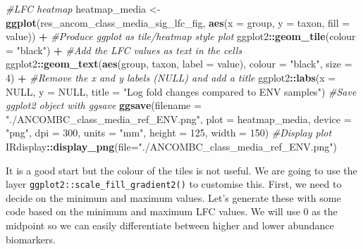 \documentclass[
]{book}
\newenvironment{Shaded}{\begin{snugshade}}{\end{snugshade}}
\newcommand{\AttributeTok}[1]{\textcolor[rgb]{0.13,0.29,0.53}{#1}}
\newcommand{\CommentTok}[1]{\textcolor[rgb]{0.56,0.35,0.01}{\textit{#1}}}
\newcommand{\ConstantTok}[1]{\textcolor[rgb]{0.56,0.35,0.01}{#1}}
\newcommand{\DecValTok}[1]{\textcolor[rgb]{0.00,0.00,0.81}{#1}}
\newcommand{\FunctionTok}[1]{\textcolor[rgb]{0.13,0.29,0.53}{\textbf{#1}}}
\newcommand{\NormalTok}[1]{#1}
\newcommand{\OtherTok}[1]{\textcolor[rgb]{0.56,0.35,0.01}{#1}}
\newcommand{\SpecialCharTok}[1]{\textcolor[rgb]{0.81,0.36,0.00}{\textbf{#1}}}
\newcommand{\StringTok}[1]{\textcolor[rgb]{0.31,0.60,0.02}{#1}}
\begin{document}
\begin{Shaded}
\begin{Highlighting}[]
\CommentTok{\#LFC heatmap}
\NormalTok{heatmap\_media }\OtherTok{\textless{}{-}} \FunctionTok{ggplot}\NormalTok{(res\_ancom\_class\_media\_sig\_lfc\_fig,}
                        \FunctionTok{aes}\NormalTok{(}\AttributeTok{x =}\NormalTok{ group, }\AttributeTok{y =}\NormalTok{ taxon, }\AttributeTok{fill =}\NormalTok{ value)) }\SpecialCharTok{+}
                  \CommentTok{\#Produce ggplot as tile/heatmap style plot}
\NormalTok{                  ggplot2}\SpecialCharTok{::}\FunctionTok{geom\_tile}\NormalTok{(}\AttributeTok{colour =} \StringTok{"black"}\NormalTok{) }\SpecialCharTok{+}
                  \CommentTok{\#Add the LFC values as text in the cells}
\NormalTok{                  ggplot2}\SpecialCharTok{::}\FunctionTok{geom\_text}\NormalTok{(}\FunctionTok{aes}\NormalTok{(group, taxon, }\AttributeTok{label =}\NormalTok{ value),}
                      \AttributeTok{colour =} \StringTok{"black"}\NormalTok{, }\AttributeTok{size =} \DecValTok{4}\NormalTok{) }\SpecialCharTok{+}
                  \CommentTok{\#Remove the x and y labels (NULL) and add a title}
\NormalTok{                  ggplot2}\SpecialCharTok{::}\FunctionTok{labs}\NormalTok{(}\AttributeTok{x =} \ConstantTok{NULL}\NormalTok{, }\AttributeTok{y =} \ConstantTok{NULL}\NormalTok{,}
                    \AttributeTok{title =} \StringTok{"Log fold changes compared to ENV samples"}\NormalTok{)}
\CommentTok{\#Save ggplot2 object with ggsave}
\FunctionTok{ggsave}\NormalTok{(}\AttributeTok{filename =} \StringTok{"./ANCOMBC\_class\_media\_ref\_ENV.png"}\NormalTok{, }\AttributeTok{plot =}\NormalTok{ heatmap\_media,}
       \AttributeTok{device =} \StringTok{"png"}\NormalTok{, }\AttributeTok{dpi =} \DecValTok{300}\NormalTok{, }\AttributeTok{units =} \StringTok{"mm"}\NormalTok{, }\AttributeTok{height =} \DecValTok{125}\NormalTok{, }\AttributeTok{width =} \DecValTok{150}\NormalTok{)}
\CommentTok{\#Display plot}
\NormalTok{IRdisplay}\SpecialCharTok{::}\FunctionTok{display\_png}\NormalTok{(}\AttributeTok{file=}\StringTok{"./ANCOMBC\_class\_media\_ref\_ENV.png"}\NormalTok{)}
\end{Highlighting}
\end{Shaded}

It is a good start but the colour of the tiles is not useful.
We are going to use the layer \texttt{ggplot2::scale\_fill\_gradient2()} to customise this.
First, we need to decide on the minimum and maximum values.
Let's generate these with some code based on the minimum and maximum LFC values.
We will use 0 as the midpoint so we can easily differentiate between higher and lower abundance biomarkers.
\end{document}
